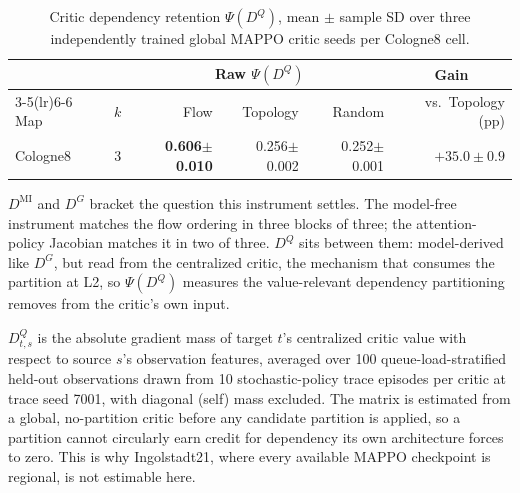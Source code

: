 \documentclass[journal]{IEEEtran}
\theoremstyle{definition}
\begin{document}
\begin{table}[t]
    \centering
    \caption{Critic dependency retention $\Psi(D^Q)$, mean $\pm$ sample SD
        over three independently trained global MAPPO critic seeds per
        Cologne8 cell.}
    \label{tab:psi-dq}
    \scriptsize
    \setlength{\tabcolsep}{2.5pt}
    \begin{tabular}{lrrrrr}
        \toprule
                 &     & \multicolumn{3}{c}{Raw $\Psi(D^Q)$} & \multicolumn{1}{c}{Gain}                                            \\
        \cmidrule(lr){3-5}\cmidrule(lr){6-6}
        Map      & $k$ & Flow                                & Topology                 & Random          & vs.\ Topology (pp)     \\
        \midrule
        Cologne8 & 3   & \textbf{0.606$\pm$0.010}            & 0.256$\pm$0.002          & 0.252$\pm$0.001 & $\mathbf{+35.0\pm0.9}$ \\
        \bottomrule
    \end{tabular}
\end{table}

$D^{\mathrm{MI}}$ and $D^{G}$ bracket the question this instrument settles.
The model-free instrument matches the flow ordering in three blocks of three; the attention-policy Jacobian matches it in two of three. $D^{Q}$ sits between them: model-derived like $D^{G}$, but read from the centralized critic, the mechanism that consumes the partition at L2, so $\Psi(D^{Q})$ measures the value-relevant dependency partitioning removes from the critic's own input.

$D^Q_{t,s}$ is the absolute gradient mass of target $t$'s centralized critic value with respect to source $s$'s observation features, averaged over 100 queue-load-stratified held-out observations drawn from 10 stochastic-policy trace episodes per critic at trace seed 7001, with diagonal (self) mass excluded.
The matrix is estimated from a global, no-partition critic before any candidate partition is applied, so a partition cannot circularly earn credit for dependency its own architecture forces to zero.
This is why Ingolstadt21, where every available MAPPO checkpoint is regional, is not estimable here.
\end{document}
